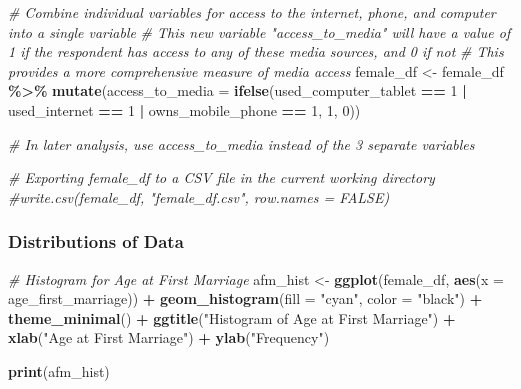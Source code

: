 \documentclass[
]{article}
\newenvironment{Shaded}{\begin{snugshade}}{\end{snugshade}}
\newcommand{\AttributeTok}[1]{\textcolor[rgb]{0.13,0.29,0.53}{#1}}
\newcommand{\CommentTok}[1]{\textcolor[rgb]{0.56,0.35,0.01}{\textit{#1}}}
\newcommand{\DecValTok}[1]{\textcolor[rgb]{0.00,0.00,0.81}{#1}}
\newcommand{\FunctionTok}[1]{\textcolor[rgb]{0.13,0.29,0.53}{\textbf{#1}}}
\newcommand{\NormalTok}[1]{#1}
\newcommand{\OtherTok}[1]{\textcolor[rgb]{0.56,0.35,0.01}{#1}}
\newcommand{\SpecialCharTok}[1]{\textcolor[rgb]{0.81,0.36,0.00}{\textbf{#1}}}
\newcommand{\StringTok}[1]{\textcolor[rgb]{0.31,0.60,0.02}{#1}}
\begin{document}
\begin{Shaded}
\begin{Highlighting}[]
\CommentTok{\# Combine individual variables for access to the internet, phone, and computer into a single variable}
\CommentTok{\# This new variable "access\_to\_media" will have a value of 1 if the respondent has access to any of these media sources, and 0 if not}
\CommentTok{\# This provides a more comprehensive measure of media access}
\NormalTok{female\_df }\OtherTok{\textless{}{-}}\NormalTok{ female\_df }\SpecialCharTok{\%\textgreater{}\%}
  \FunctionTok{mutate}\NormalTok{(}\AttributeTok{access\_to\_media =} \FunctionTok{ifelse}\NormalTok{(used\_computer\_tablet }\SpecialCharTok{==} \DecValTok{1} \SpecialCharTok{|}\NormalTok{ used\_internet }\SpecialCharTok{==} \DecValTok{1} \SpecialCharTok{|}\NormalTok{ owns\_mobile\_phone }\SpecialCharTok{==} \DecValTok{1}\NormalTok{, }\DecValTok{1}\NormalTok{, }\DecValTok{0}\NormalTok{))}

\CommentTok{\# In later analysis, use access\_to\_media instead of the 3 separate variables}
\end{Highlighting}
\end{Shaded}

\begin{Shaded}
\begin{Highlighting}[]
\CommentTok{\# Exporting female\_df to a CSV file in the current working directory}
\CommentTok{\#write.csv(female\_df, "female\_df.csv", row.names = FALSE)}
\end{Highlighting}
\end{Shaded}

\hypertarget{distributions-of-data}{%
\subsubsection{Distributions of Data}\label{distributions-of-data}}

\begin{Shaded}
\begin{Highlighting}[]
\CommentTok{\# Histogram for \textquotesingle{}Age at First Marriage\textquotesingle{}}
\NormalTok{afm\_hist }\OtherTok{\textless{}{-}} \FunctionTok{ggplot}\NormalTok{(female\_df, }\FunctionTok{aes}\NormalTok{(}\AttributeTok{x =}\NormalTok{ age\_first\_marriage)) }\SpecialCharTok{+}
  \FunctionTok{geom\_histogram}\NormalTok{(}\AttributeTok{fill =} \StringTok{"cyan"}\NormalTok{, }\AttributeTok{color =} \StringTok{"black"}\NormalTok{) }\SpecialCharTok{+}
  \FunctionTok{theme\_minimal}\NormalTok{() }\SpecialCharTok{+}
  \FunctionTok{ggtitle}\NormalTok{(}\StringTok{"Histogram of Age at First Marriage"}\NormalTok{) }\SpecialCharTok{+}
  \FunctionTok{xlab}\NormalTok{(}\StringTok{"Age at First Marriage"}\NormalTok{) }\SpecialCharTok{+}
  \FunctionTok{ylab}\NormalTok{(}\StringTok{"Frequency"}\NormalTok{)}

\FunctionTok{print}\NormalTok{(afm\_hist)}
\end{Highlighting}
\end{Shaded}
\end{document}
